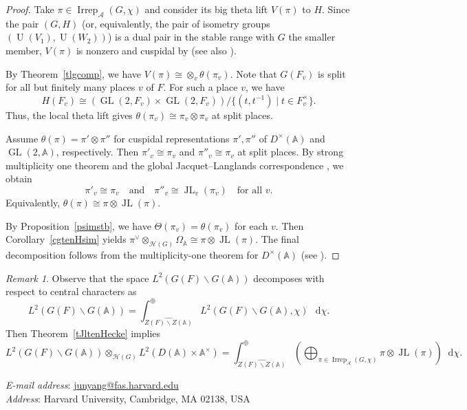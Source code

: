 \documentclass[11pt]{article}
\theoremstyle{plain}
\theoremstyle{remark}
\newtheorem{remark}[theorem]{Remark}
\theoremstyle{definition}
\newcommand*\dd{\mathop{}\!\mathrm{d}}
\DeclareMathOperator{\GL}{GL}
\DeclareMathOperator{\U}{U}
\DeclareMathOperator{\JL}{JL}
\DeclareMathOperator{\irr}{Irrep}
\begin{document}
\begin{proof}
Take $\pi\in \irr_{\mathcal{A}}(G,\chi)$ and consider its big theta lift $V(\pi)$ to $H$.
Since the pair $(G,H)$ (or, equivalently, the pair of isometry groups $(\U(V_1),\U(W_2))$) is a dual pair in the stable range with $G$ the smaller member, $V(\pi)$ is nonzero and cuspidal by \cite[Proposition~3.2]{Gan2024} (see also \cite[Theorem~I.1.1]{Rallis1984}).

By Theorem~\ref{tlgcomp}, we have $V(\pi)\cong\otimes_{v}\theta(\pi_v)$.
Note that $G(F_v)$ is split for all but finitely many places $v$ of $F$.
For such a place $v$, we have
\[
H(F_v)\cong (\GL(2,F_v)\times \GL(2,F_v))/\{(t,t^{-1})\mid t\in F_v^{\times}\}.
\]
Thus, the local theta lift gives $\theta(\pi_v)\cong \pi_v\otimes\pi_v$ at split places.

Assume $\theta(\pi)=\pi'\otimes\pi''$ for cuspidal representations $\pi',\pi''$ of $D^{\times}(\mathbb{A})$ and $\GL(2,\mathbb{A})$, respectively.
Then $\pi'_v\cong\pi_v$ and $\pi''_v\cong \pi_v$ at split places.
By strong multiplicity one theorem \cite{Shapiro1979mult1} and the global Jacquet--Langlands correspondence \cite[Theorem~5.1]{Badu08}, we obtain
\[
\pi'_v\cong \pi_v\quad \text{and}\quad \pi''_v\cong \JL_v(\pi_v)\quad \text{for all } v.
\]
Equivalently, $\theta(\pi)\cong \pi\otimes \JL(\pi)$.

By Proposition~\ref{psimstb}, we have $\Theta(\pi_v)=\theta(\pi_v)$ for each $v$.
Then Corollary~\ref{cgtenHsim} yields $\pi^{\vee}\otimes_{\mathcal{H}(G)}\Omega_{\mathbb{A}}\cong\pi\otimes\JL(\pi)$.
The final decomposition follows from the multiplicity-one theorem for $D^{\times}(\mathbb{A})$ (see \cite[Theorem~5.1]{Badu08}). 
\end{proof}

\begin{remark}
Observe that the space $L^2(G(F)\backslash G(\mathbb{A}))$ decomposes with respect to central characters as
\[
L^2(G(F)\backslash G(\mathbb{A}))=\int_{\widehat{Z(F)\backslash Z(\mathbb{A})}}^{\oplus}L^2(G(F)\backslash G(\mathbb{A}),\chi)\,\dd\chi.
\]
Then Theorem~\ref{tJltenHecke} implies
\[
L^2(G(F)\backslash G(\mathbb{A}))\otimes_{\mathcal{H}(G)}L^2(D(\mathbb{A})\times \mathbb{A}^{\times})
=
\int_{\widehat{Z(F)\backslash Z(\mathbb{A})}}^{\oplus}\left(\bigoplus_{\pi\in\irr_{\mathcal{A}}(G,\chi)}\pi\otimes\JL(\pi)\right)\dd\chi.
\]
\end{remark}

\apptocmd{\thebibliography}{%
  \setlength{\itemsep}{2pt}%
  \setlength{\parsep}{0pt}%
  \setlength{\parskip}{0pt}%
}{}{}


\typeout{}

\noindent
\textit{E-mail address}: \href{mailto:junyang@fas.harvard.edu}{junyang@fas.harvard.edu}\\
\noindent
\textit{Address}:{ Harvard University, Cambridge, MA 02138, USA}
\end{document}
